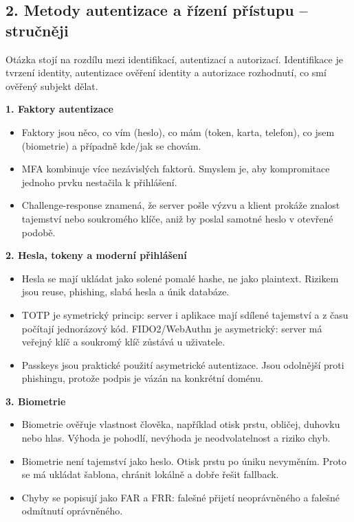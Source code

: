
\subsection*{2. Metody autentizace a řízení přístupu -- stručněji}
Otázka stojí na rozdílu mezi identifikací, autentizací a autorizací. Identifikace je tvrzení identity, autentizace ověření identity a autorizace rozhodnutí, co smí ověřený subjekt dělat.

\textbf{1. Faktory autentizace}
\begin{itemize}
  \item Faktory jsou něco, co vím (heslo), co mám (token, karta, telefon), co jsem (biometrie) a případně kde/jak se chovám.
  \item MFA kombinuje více nezávislých faktorů. Smyslem je, aby kompromitace jednoho prvku nestačila k přihlášení.
  \item Challenge-response znamená, že server pošle výzvu a klient prokáže znalost tajemství nebo soukromého klíče, aniž by poslal samotné heslo v otevřené podobě.
\end{itemize}

\textbf{2. Hesla, tokeny a moderní přihlášení}
\begin{itemize}
  \item Hesla se mají ukládat jako solené pomalé hashe, ne jako plaintext. Rizikem jsou reuse, phishing, slabá hesla a únik databáze.
  \item TOTP je symetrický princip: server i aplikace mají sdílené tajemství a z času počítají jednorázový kód. FIDO2/WebAuthn je asymetrický: server má veřejný klíč a soukromý klíč zůstává u uživatele.
  \item Passkeys jsou praktické použití asymetrické autentizace. Jsou odolnější proti phishingu, protože podpis je vázán na konkrétní doménu.
\end{itemize}

\textbf{3. Biometrie}
\begin{itemize}
  \item Biometrie ověřuje vlastnost člověka, například otisk prstu, obličej, duhovku nebo hlas. Výhoda je pohodlí, nevýhoda je neodvolatelnost a riziko chyb.
  \item Biometrie není tajemství jako heslo. Otisk prstu po úniku nevyměním. Proto se má ukládat šablona, chránit lokálně a dobře řešit fallback.
  \item Chyby se popisují jako FAR a FRR: falešné přijetí neoprávněného a falešné odmítnutí oprávněného.
\end{itemize}


